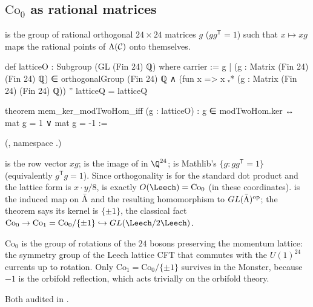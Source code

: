 \subsection{\texorpdfstring{$\mathrm{Co}_0$}{Co0} as rational matrices}

\begin{definition}[$\mathrm{Co}_0$]\label{ch21:def:latticeO}
 is the group of rational orthogonal $24\times24$ matrices $g$ ($gg^{\mathsf T}=1$) such
that $x\mapsto xg$ maps the rational points of $\Lambda(\mathcal{C})$ onto themselves.
\end{definition}
\begin{leancode}
def latticeO : Subgroup (GL (Fin 24) ℚ) where
  carrier := {g | (g : Matrix (Fin 24) (Fin 24) ℚ) ∈ orthogonalGroup (Fin 24) ℚ ∧
    (fun x => x ᵥ* (g : Matrix (Fin 24) (Fin 24) ℚ)) '' latticeQ = latticeQ}
\end{leancode}
\begin{leancode}
theorem mem_ker_modTwoHom_iff (g : latticeO) : g ∈ modTwoHom.ker ↔ mat g = 1 ∨ mat g = -1 :=
\end{leancode}
(, namespace .)
\begin{dictionary}
 is the row vector $xg$;  is the image of  in
$\Q^{24}$;  is Mathlib's $\{g: gg^{\mathsf T}=1\}$ (equivalently
$g^{\mathsf T}g=1$).  Since orthogonality is for the standard dot product and the lattice form is
$x\cdot y/8$,  is exactly $O(\Leech)=\mathrm{Co}_0$ (in these coordinates).
 is the induced map on $\bar{\Lambda}$ and  the resulting homomorphism to
$GL(\bar{\Lambda})^{\mathrm{op}}$; the theorem says its kernel is $\{\pm1\}$, the classical fact
$\mathrm{Co}_0\to\mathrm{Co}_1=\mathrm{Co}_0/\{\pm1\}\hookrightarrow GL(\Leech/2\Leech)$.
\end{dictionary}
\begin{physics}
$\mathrm{Co}_0$ is the group of rotations of the $24$ bosons preserving the momentum lattice: the
symmetry group of the Leech lattice CFT that commutes with the $U(1)^{24}$ currents up to rotation.
Only $\mathrm{Co}_1=\mathrm{Co}_0/\{\pm1\}$ survives in the Monster, because $-1$ is the orbifold
reflection, which acts trivially on the orbifold theory.
\end{physics}
\begin{status}
Both audited in .
\end{status}

